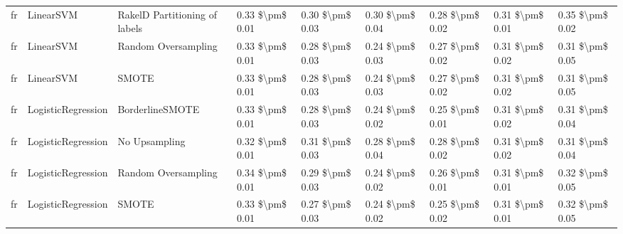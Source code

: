 \begin{tabular}{lllllllll}
      fr &                       LinearSVM & RakelD Partitioning of labels &     0.33 \$\textbackslash pm\$ 0.01 &           0.30 \$\textbackslash pm\$ 0.03 &       0.30 \$\textbackslash pm\$ 0.04 &        0.28 \$\textbackslash pm\$ 0.02 &                         0.31 \$\textbackslash pm\$ 0.01 &     0.35 \$\textbackslash pm\$ 0.02 \\
      fr &                       LinearSVM &           Random Oversampling &     0.33 \$\textbackslash pm\$ 0.01 &           0.28 \$\textbackslash pm\$ 0.03 &       0.24 \$\textbackslash pm\$ 0.03 &        0.27 \$\textbackslash pm\$ 0.02 &                         0.31 \$\textbackslash pm\$ 0.02 &     0.31 \$\textbackslash pm\$ 0.05 \\
      fr &                       LinearSVM &                         SMOTE &     0.33 \$\textbackslash pm\$ 0.01 &           0.28 \$\textbackslash pm\$ 0.03 &       0.24 \$\textbackslash pm\$ 0.03 &        0.27 \$\textbackslash pm\$ 0.02 &                         0.31 \$\textbackslash pm\$ 0.02 &     0.31 \$\textbackslash pm\$ 0.05 \\
      fr &              LogisticRegression &               BorderlineSMOTE &     0.33 \$\textbackslash pm\$ 0.01 &           0.28 \$\textbackslash pm\$ 0.03 &       0.24 \$\textbackslash pm\$ 0.02 &        0.25 \$\textbackslash pm\$ 0.01 &                         0.31 \$\textbackslash pm\$ 0.02 &     0.31 \$\textbackslash pm\$ 0.04 \\
      fr &              LogisticRegression &                 No Upsampling &     0.32 \$\textbackslash pm\$ 0.01 &           0.31 \$\textbackslash pm\$ 0.03 &       0.28 \$\textbackslash pm\$ 0.04 &        0.28 \$\textbackslash pm\$ 0.02 &                         0.31 \$\textbackslash pm\$ 0.02 &     0.31 \$\textbackslash pm\$ 0.04 \\
      fr &              LogisticRegression &           Random Oversampling &     0.34 \$\textbackslash pm\$ 0.01 &           0.29 \$\textbackslash pm\$ 0.03 &       0.24 \$\textbackslash pm\$ 0.02 &        0.26 \$\textbackslash pm\$ 0.01 &                         0.31 \$\textbackslash pm\$ 0.01 &     0.32 \$\textbackslash pm\$ 0.05 \\
      fr &              LogisticRegression &                         SMOTE &     0.33 \$\textbackslash pm\$ 0.01 &           0.27 \$\textbackslash pm\$ 0.03 &       0.24 \$\textbackslash pm\$ 0.02 &        0.25 \$\textbackslash pm\$ 0.02 &                         0.31 \$\textbackslash pm\$ 0.01 &     0.32 \$\textbackslash pm\$ 0.05 \\

\end{tabular}
